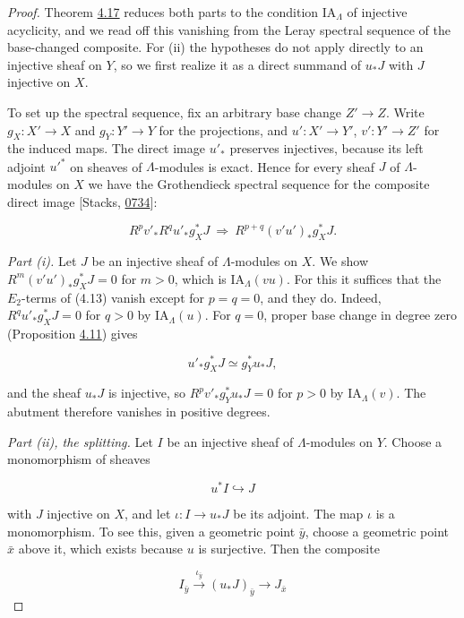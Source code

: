 \documentclass[11pt]{article}
\begin{document}
\begin{proof}[{Proof}]\label{bp370}%
Theorem \hyperref[bp329]{4.17} reduces both parts to the condition \(\mathrm{IA}_\Lambda\) of injective acyclicity, and we read off this vanishing from the Leray spectral sequence of the base-changed composite. For (ii) the hypotheses do not apply directly to an injective sheaf on \(Y\), so we first realize it as a direct summand of \(u_*J\) with \(J\) injective on \(X\).

To set up the spectral sequence, fix an arbitrary base change \(Z'\to Z\). Write \(g_X:X'\to X\) and \(g_Y:Y'\to Y\) for the projections, and \(u':X'\to Y'\), \(v':Y'\to Z'\) for the induced maps. The direct image \(u'_*\) preserves injectives, because its left adjoint \(u'^*\) on sheaves of \(\Lambda\)-modules is exact. Hence for every sheaf \(J\) of \(\Lambda\)-modules on \(X\) we have the Grothendieck spectral sequence for the composite direct image [Stacks, \href{https://stacks.math.columbia.edu/tag/0734}{0734}]:

\[
R^pv'_*R^qu'_*g_X^*J
\ \Longrightarrow\ R^{p+q}(v'u')_*g_X^*J.
\tag{4.13}
\]

\emph{Part (i).} Let \(J\) be an injective sheaf of \(\Lambda\)-modules on \(X\). We show \(R^m(v'u')_*g_X^*J=0\) for \(m>0\), which is \(\mathrm{IA}_\Lambda(vu)\). For this it suffices that the \(E_2\)-terms of (4.13) vanish except for \(p=q=0\), and they do. Indeed, \(R^qu'_*g_X^*J=0\) for \(q>0\) by \(\mathrm{IA}_\Lambda(u)\). For \(q=0\), proper base change in degree zero (Proposition \hyperref[bp314]{4.11}) gives

\[
u'_*g_X^*J\simeq g_Y^*u_*J,
\]

and the sheaf \(u_*J\) is injective, so \(R^pv'_*g_Y^*u_*J=0\) for \(p>0\) by \(\mathrm{IA}_\Lambda(v)\). The abutment therefore vanishes in positive degrees.

\emph{Part (ii), the splitting.} Let \(I\) be an injective sheaf of \(\Lambda\)-modules on \(Y\). Choose a monomorphism of sheaves

\[
u^*I\hookrightarrow J
\]

with \(J\) injective on \(X\), and let \(\iota:I\to u_*J\) be its adjoint. The map \(\iota\) is a monomorphism. To see this, given a geometric point \(\bar y\), choose a geometric point \(\bar x\) above it, which exists because \(u\) is surjective. Then the composite

\[
I_{\bar y}\xrightarrow{\iota_{\bar y}}(u_*J)_{\bar y}
\longrightarrow J_{\bar x}
\]


\end{proof}
\end{document}
